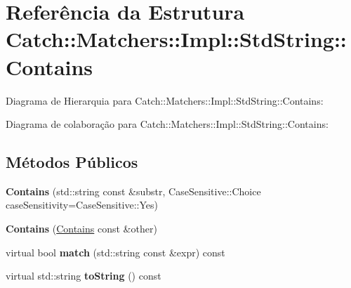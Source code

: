 \hypertarget{structCatch_1_1Matchers_1_1Impl_1_1StdString_1_1Contains}{}\section{Referência da Estrutura Catch\+:\+:Matchers\+:\+:Impl\+:\+:Std\+String\+:\+:Contains}
\label{structCatch_1_1Matchers_1_1Impl_1_1StdString_1_1Contains}


Diagrama de Hierarquia para Catch\+:\+:Matchers\+:\+:Impl\+:\+:Std\+String\+:\+:Contains\+:


Diagrama de colaboração para Catch\+:\+:Matchers\+:\+:Impl\+:\+:Std\+String\+:\+:Contains\+:
\subsection*{Métodos Públicos}
\begin{DoxyCompactItemize}
\item 
{\bfseries Contains} (std\+::string const \&substr, Case\+Sensitive\+::\+Choice case\+Sensitivity=Case\+Sensitive\+::\+Yes)\hypertarget{structCatch_1_1Matchers_1_1Impl_1_1StdString_1_1Contains_a7a062d83bd3e3075929dbb55e1c24258}{}\label{structCatch_1_1Matchers_1_1Impl_1_1StdString_1_1Contains_a7a062d83bd3e3075929dbb55e1c24258}

\item 
{\bfseries Contains} (\hyperlink{structCatch_1_1Matchers_1_1Impl_1_1StdString_1_1Contains}{Contains} const \&other)\hypertarget{structCatch_1_1Matchers_1_1Impl_1_1StdString_1_1Contains_ad6b1ef653dfcb3bab43c43be043dc4e8}{}\label{structCatch_1_1Matchers_1_1Impl_1_1StdString_1_1Contains_ad6b1ef653dfcb3bab43c43be043dc4e8}

\item 
virtual bool {\bfseries match} (std\+::string const \&expr) const \hypertarget{structCatch_1_1Matchers_1_1Impl_1_1StdString_1_1Contains_aa27d823dea5770025a24424fc3355a6f}{}\label{structCatch_1_1Matchers_1_1Impl_1_1StdString_1_1Contains_aa27d823dea5770025a24424fc3355a6f}

\item 
virtual std\+::string {\bfseries to\+String} () const \hypertarget{structCatch_1_1Matchers_1_1Impl_1_1StdString_1_1Contains_a226755351f3598179925f3ab89d6def7}{}\label{structCatch_1_1Matchers_1_1Impl_1_1StdString_1_1Contains_a226755351f3598179925f3ab89d6def7}

\end{DoxyCompactItemize}
